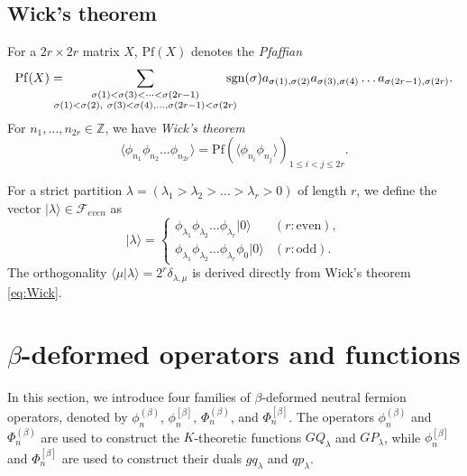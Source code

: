 \documentclass{amsart}
\def\ZZ{\mathord{\mathbb{Z}}}
\def\ket#1{\vert #1 \rangle}
\begin{document}
\subsection{Wick's theorem}


For a $2r\times 2r$ matrix $X$, $\mathrm{Pf}(X)$ denotes the \textit{Pfaffian}
\begin{equation}\label{eq:Pfaffian_def}
\mathrm{Pf}(X)=
\hspace{-1em}
\sum_{\substack{
\sigma(1)<\sigma(3)<\cdots <\sigma(2r-1)\\
\sigma(1)<\sigma(2),\ 
\sigma(3)<\sigma(4),\dots,
\sigma(2r-1)<\sigma(2r)
}}
\hspace{-1em}
\mathrm{sgn}(\sigma)
a_{\sigma(1),\sigma(2)}
a_{\sigma(3),\sigma(4)}\dots a_{\sigma(2r-1),\sigma(2r)}.
\end{equation}
For $n_1,\dots,n_{2r}\in \ZZ$, we have \textit{Wick's theorem} 
\begin{equation}\label{eq:Wick}
\langle
\phi_{n_1}\phi_{n_2}\dots \phi_{n_{2r}}
\rangle
=\mathrm{Pf}
\left(
\langle
\phi_{n_i}\phi_{n_j}
\rangle
\right)_{1\leq i<j\leq 2r}.
\end{equation}

For a strict partition $\lambda=(\lambda_1>\lambda_2>\dots>\lambda_r>0)$ of length $r$, we define the vector $\ket{\lambda}\in \mathcal{F}_{even}$ as
\[
\ket{\lambda}=\begin{cases}
\phi_{\lambda_1}\phi_{\lambda_2}\dots \phi_{\lambda_r}\ket{0} & (r:\mbox{even}),\\
\phi_{\lambda_1}\phi_{\lambda_2}\dots \phi_{\lambda_r}\phi_0\ket{0}  & (r:\mbox{odd}).
\end{cases}
\]
The orthogonality $\langle \mu|\lambda\rangle=2^r\delta_{\lambda,\mu}$ is derived directly from Wick's theorem \eqref{eq:Wick}.


\section{$\beta$-deformed operators and functions}\label{sec:beta_def_op}


In this section, we introduce four families of $\beta$-deformed neutral fermion operators, denoted by $\phi_n^{(\beta)}$, $\phi_n^{[\beta]}$, $\Phi_n^{(\beta)}$, and $\Phi_n^{[\beta]}$.  
The operators $\phi_n^{(\beta)}$ and $\Phi_n^{(\beta)}$ are used to construct the $K$-theoretic functions $GQ_\lambda$ and $GP_\lambda$, while $\phi_n^{[\beta]}$ and $\Phi_n^{[\beta]}$ are used to construct their duals $gq_\lambda$ and $qp_\lambda$.
\end{document}
